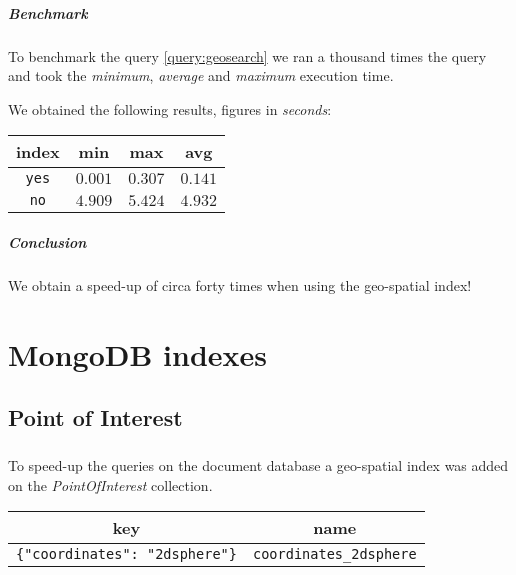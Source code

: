

\paragraph{Benchmark}
To benchmark the query \ref{query:geosearch} we ran a thousand times the query
and took the \textit{minimum}, \textit{average} and \textit{maximum} execution
time.



We obtained the following results, figures in \textit{seconds}:

\begin{tabular}{|c|c|c|c|}
	\hline
	index & min & max & avg \\
	\hline
	\hline
	\texttt{yes} & $0.001$ & $0.307$ & $0.141$  \\
	\hline
	\texttt{no} & $4.909$ & $5.424$ & $4.932$  \\
	\hline
\end{tabular}

\paragraph{Conclusion}
We obtain a speed-up of circa forty times when using the geo-spatial index!

\chapter{MongoDB indexes}

\section{Point of Interest}

\paragraph{}
To speed-up the queries on the document database a geo-spatial index was added
on the \textit{PointOfInterest} collection.

\begin{tabular}{|c|c|}
	\hline
	key & name \\
	\hline
	\texttt{\{"coordinates": "2dsphere"\}} & \texttt{coordinates\_2dsphere}
	\\
	\hline
\end{tabular}

